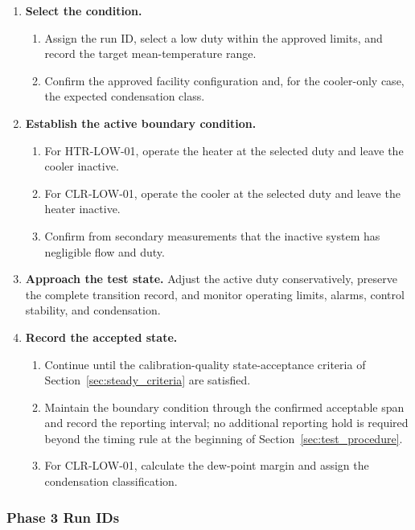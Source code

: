 \documentclass[11pt]{article}
\begin{document}
\begin{enumerate}
    \item \textbf{Select the condition.}
    \begin{enumerate}
        \item Assign the run ID, select a low duty within the approved limits, and record the target mean-temperature range.
        \item Confirm the approved facility configuration and, for the cooler-only case, the expected condensation class.
    \end{enumerate}

    \item \textbf{Establish the active boundary condition.}
    \begin{enumerate}
        \item For HTR-LOW-01, operate the heater at the selected duty and leave the cooler inactive.
        \item For CLR-LOW-01, operate the cooler at the selected duty and leave the heater inactive.
        \item Confirm from secondary measurements that the inactive system has negligible flow and duty.
    \end{enumerate}

    \item \textbf{Approach the test state.}
    Adjust the active duty conservatively, preserve the complete transition record, and monitor operating limits, alarms, control stability, and condensation.

    \item \textbf{Record the accepted state.}
    \begin{enumerate}
        \item Continue until the calibration-quality state-acceptance criteria of Section~\ref{sec:steady_criteria} are satisfied.
        \item Maintain the boundary condition through the confirmed acceptable span and record the reporting interval; no additional reporting hold is required beyond the timing rule at the beginning of Section~\ref{sec:test_procedure}.
        \item For CLR-LOW-01, calculate the dew-point margin and assign the condensation classification.
    \end{enumerate}
\end{enumerate}

\subsubsection{Phase 3 Run IDs}
\end{document}
